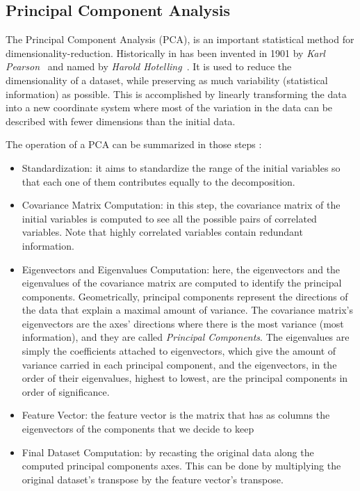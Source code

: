 \subsection{Principal Component Analysis}\label{IPCA}
The Principal Component Analysis (PCA), is an important statistical method for dimensionality-reduction. 
Historically in has been invented in 1901 by \textit{Karl Pearson}~\cite{pearson_karl_1901_1430636} and named by \textit{Harold Hotelling}~\cite{10.2307/2333955}.
It is used to reduce the  dimensionality of a dataset, while preserving as much variability (statistical information) as possible\cite{jolliffe2016principal}. 
This is accomplished by linearly transforming the data into a new coordinate system where most of the variation in the data can be described with fewer dimensions than the initial data.

The operation of a PCA can be summarized in those steps \cite{noauthor_principal_nodate, ho_principal_nodate, noauthor_beginners_nodate}: 
\begin{itemize}
    \item Standardization: it aims to standardize the range of the initial variables so that each one of them contributes equally to the decomposition.
    
    \item Covariance Matrix Computation: in this step, the covariance matrix of the initial variables is computed to see all the possible pairs of correlated variables. Note that highly correlated variables contain redundant information.
    
    \item Eigenvectors and Eigenvalues Computation: here, the eigenvectors and the eigenvalues of the covariance matrix are computed to identify the principal components. Geometrically, principal components represent the directions of the data that explain a maximal amount of variance. The covariance matrix's eigenvectors are the axes' directions where there is the most variance (most information), and they are called \textit{Principal Components}. The eigenvalues are simply the coefficients attached to eigenvectors, which give the amount of variance carried in each principal component, and the eigenvectors, in the order of their eigenvalues, highest to lowest, are the principal components in order of significance.
    
    \item Feature Vector: the feature vector is the matrix that has as columns the eigenvectors of the components that we decide to keep

    \item Final Dataset Computation: by recasting the original data along the computed principal components axes. This can be done by multiplying the original dataset's transpose by the feature vector's transpose.
    
\end{itemize}

